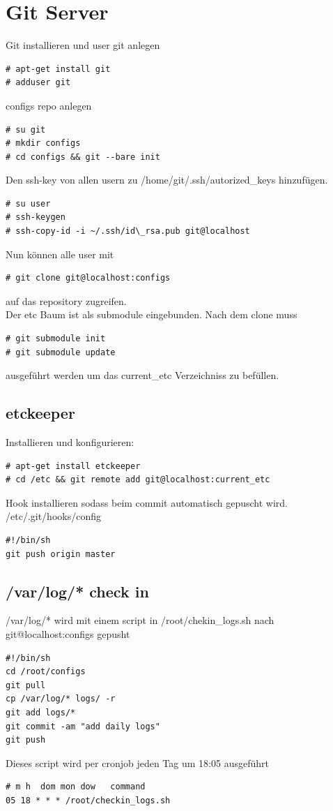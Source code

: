 \section{Git Server}
Git installieren und user git anlegen
\begin{lstlisting}[style=Bash]
# apt-get install git
# adduser git
\end{lstlisting}
configs repo anlegen
\begin{lstlisting}[style=Bash]
# su git
# mkdir configs
# cd configs && git --bare init
\end{lstlisting}
Den ssh-key von allen usern zu /home/git/.ssh/autorized\_keys hinzufügen.
\begin{lstlisting}[style=Bash]
# su user
# ssh-keygen
# ssh-copy-id -i ~/.ssh/id\_rsa.pub git@localhost
\end{lstlisting}
Nun können alle user mit
\begin{lstlisting}[style=Bash]
# git clone git@localhost:configs
\end{lstlisting}
auf das repository zugreifen.\\
Der etc Baum ist als submodule eingebunden. Nach dem clone muss
\begin{lstlisting}[style=Bash]
# git submodule init
# git submodule update
\end{lstlisting}
ausgeführt werden um das current\_etc Verzeichniss zu befüllen.
\subsection{etckeeper}
Installieren und konfigurieren:
\begin{lstlisting}[style=Bash]
# apt-get install etckeeper
# cd /etc && git remote add git@localhost:current_etc
\end{lstlisting}
Hook installieren sodass beim commit automatisch gepuscht wird.
/etc/.git/hooks/config
\begin{lstlisting}[style=Bash]
#!/bin/sh
git push origin master
\end{lstlisting}

\subsection{/var/log/* check in}
/var/log/* wird mit einem script in /root/chekin\_logs.sh nach git@localhost:configs gepusht
\begin{lstlisting}[style=Bash]
#!/bin/sh
cd /root/configs
git pull
cp /var/log/* logs/ -r
git add logs/*
git commit -am "add daily logs"
git push
\end{lstlisting}
Dieses script wird per cronjob jeden Tag um 18:05 ausgeführt
\begin{lstlisting}[style=Bash]
# m h  dom mon dow   command
05 18 * * * /root/checkin_logs.sh
\end{lstlisting}
